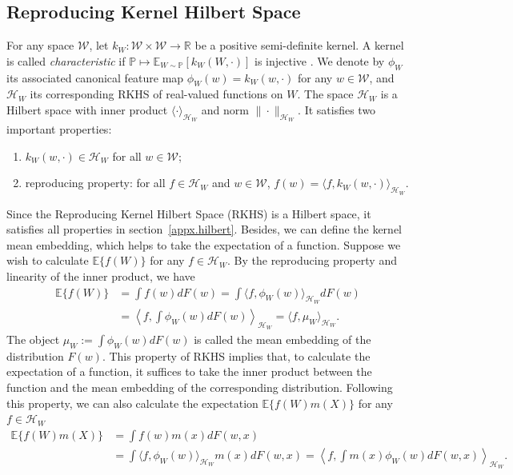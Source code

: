 \documentclass[
  12pt]{article}
\def\to{\rightarrow}
\def\mE{\mathbb{E}}
\def\mP{\mathbb{P}}
\def\cH{\mathcal{H}}
\def\cW{\mathcal{W}}
\def\mE{\mathbb{E}}
\begin{document}
\subsection{Reproducing Kernel Hilbert Space}\label{appx.rkhs}
For any space $\cW$, let $k_W: \cW \times \cW \to \mathbb{R}$ be a positive semi-definite kernel. A kernel is called \emph{characteristic} if $\mP \mapsto \mE_{W \sim \mP}[k_W(W,\cdot)]$ is injective \citep{fukumizu2004dimensionality}. We denote by $\phi_W$ its associated canonical feature map $\phi_W(w)=k_W(w,\cdot)$ for any $w\in \cW$, and $\cH_W$ its corresponding RKHS of real-valued functions on $W$. The space $\cH_W$ is a Hilbert space with inner product $\langle\cdot\rangle_{\cH_W}$ and norm $\|\cdot\|_{\cH_W}$. It satisfies two important properties:
\begin{enumerate}
    \item $k_W(w,\cdot)\in \cH_W$ for all $w\in \cW$;
    \item reproducing property: for all $f\in \cH_W$ and $w\in \cW$, $f(w)=\langle f,k_W(w,\cdot)\rangle_{\mathcal{H}_{W}}$. 
\end{enumerate}
Since the Reproducing Kernel Hilbert Space (RKHS) is a Hilbert space, it satisfies all properties in section~\ref{appx.hilbert}. Besides, we can define the kernel mean embedding, which helps to take the expectation of a function. Suppose we wish to calculate $\mE\{f(W)\}$ for any $f\in\cH_W$. By the reproducing property and linearity of the inner product, we have
\begin{align*}
    \mathbb{E}\{f(W)\}&=\int f(w)dF(w)=\int\langle f,\phi_W(w)\rangle_{\mathcal{H}_W}dF(w)\\
    &=\left\langle f,\int\phi_W(w)dF(w)\right\rangle_{\mathcal{H}_W}=\langle f,\mu_W\rangle_{\mathcal{H}_W}.
\end{align*}
The object $\mu_W:=\int\phi_W(w)dF(w)$ is called the mean embedding of the distribution $F(w)$. This property of RKHS implies that, to calculate the expectation of a function, it suffices to take the inner product between the function and the mean embedding of the corresponding distribution. Following this property, we can also calculate the expectation $\mE\{f(W)m(X)\}$ for any $f\in\cH_W$
\begin{equation}\label{eq.kernel_mean_embedding}
    \begin{aligned}
        \mathbb{E}\{f(W)m(X)\}&=\int f(w)m(x)dF(w,x)\\
        &=\int\langle f,\phi_W(w)\rangle_{\mathcal{H}_W}m(x)dF(w,x)=\left\langle f,\int m(x)\phi_W(w)dF(w,x)\right\rangle_{\mathcal{H}_W}.
    \end{aligned}
\end{equation}
\end{document}
